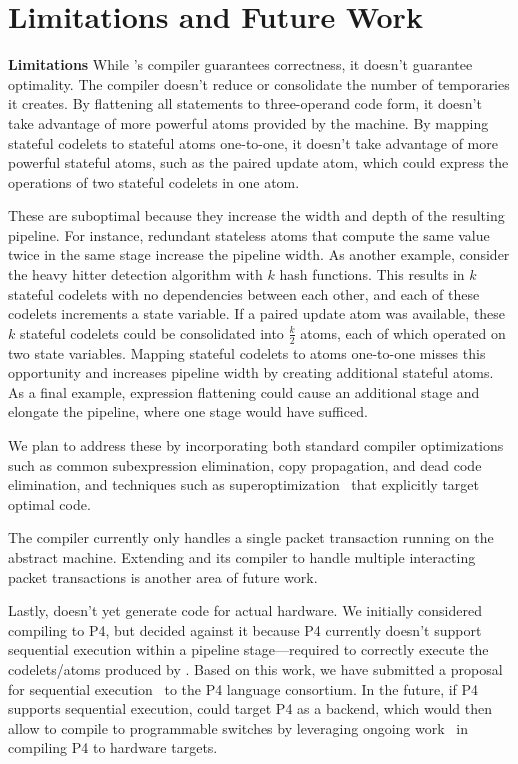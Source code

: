 \section{Limitations and Future Work}
\label{s:limitations}

\textbf{Limitations}
While \pktlanguage's compiler guarantees correctness, it doesn't guarantee
optimality.  The \pktlanguage compiler doesn't reduce or consolidate the number
of temporaries it creates. By flattening all statements to three-operand code
form, it doesn't take advantage of more powerful atoms provided by the
\absmachine machine. By mapping stateful codelets to stateful atoms
one-to-one, it doesn't take advantage of more powerful stateful atoms, such as
the paired update atom, which could express the operations of two stateful
codelets in one atom.

These are suboptimal because they increase the width and depth of the resulting
pipeline. For instance, redundant stateless atoms that compute the same value
twice in the same stage increase the pipeline width. As another example,
consider the heavy hitter detection algorithm with $k$ hash functions.  This
results in $k$ stateful codelets with no dependencies between each other, and
each of these codelets increments a state variable. If a paired update atom was
available, these $k$ stateful codelets could be consolidated into $\frac{k}{2}$
atoms, each of which operated on two state variables.  Mapping stateful
codelets to atoms one-to-one misses this opportunity and increases pipeline
width by creating additional stateful atoms.  As a final example, expression
flattening could cause an additional stage and elongate the pipeline, where one
stage would have sufficed.

We plan to address these by incorporating both standard compiler optimizations
such as common subexpression elimination, copy propagation, and dead code
elimination, and techniques such as superoptimization~\cite{stoke,
superoptimizer} that explicitly target optimal code.

The \pktlanguage compiler currently only handles a single packet transaction
running on the abstract machine.  Extending \pktlanguage and its compiler to
handle multiple interacting packet transactions is another area of future work.

Lastly, \pktlanguage doesn't yet generate code for actual hardware. We
initially considered compiling \pktlanguage to P4, but decided against it
because P4 currently doesn't support sequential execution within a
pipeline stage---required to correctly execute the codelets/atoms produced by
\pktlanguage. Based on this work, we have submitted a proposal for sequential
execution~\cite{p4-semantics} to the P4 language consortium. In the future, if
P4 supports sequential execution, \pktlanguage could target P4 as a backend,
which would then allow \pktlanguage to compile to programmable switches by
leveraging ongoing work~\cite{netronome, xilinx,lavanya_compiler} in compiling
P4 to hardware targets.

